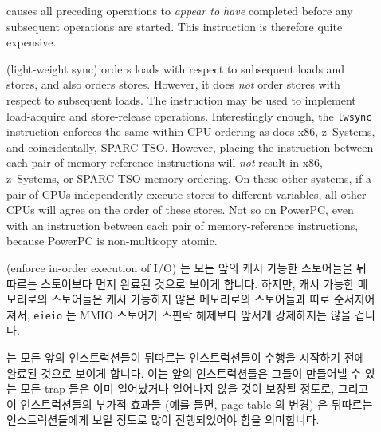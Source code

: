 \begin{description}
\item	[] causes all preceding operations to {\em appear to have}
	completed before any subsequent operations are started.
	This instruction is therefore quite expensive.
\item	[] (light-weight sync) orders loads with respect to
	subsequent loads and stores, and also orders stores.
	However, it does {\em not} order stores with respect to subsequent
	loads.
	The  instruction may be used to implement
	load-acquire and store-release operations.
	Interestingly enough, the {\tt lwsync} instruction enforces
	the same within-CPU ordering as does x86, z~Systems, and coincidentally,
	SPARC TSO.
	However, placing the  instruction between each
	pair of memory-reference instructions will \emph{not}
	result in x86, z~Systems, or SPARC TSO memory ordering.
	On these other systems, if a pair of CPUs independently execute
	stores to different variables, all other CPUs will agree on the
	order of these stores.
	Not so on PowerPC, even with an  instruction between each
	pair of memory-reference instructions, because PowerPC is
	non-multicopy atomic.
\fi
\item	[] (enforce in-order execution of I/O) 는 모든 앞의 캐시
	가능한 스토어들을 뒤따르는 스토어보다 먼저 완료된 것으로 보이게 합니다.
	하지만, 캐시 가능한 메모리로의 스토어들은 캐시 가능하지 않은 메모리로의
	스토어들과 따로 순서지어져서, {\tt eieio} 는 MMIO 스토어가 스핀락
	해제보다 앞서게 강제하지는 않을 겁니다.
\item	[] 는 모든 앞의 인스트럭션들이 뒤따르는 인스트럭션들이
	수행을 시작하기 전에 완료된 것으로 보이게 합니다.
	이는 앞의 인스트럭션들은 그들이 만들어낼 수 있는 모든 trap 들은 이미
	일어났거나 일어나지 않을 것이 보장될 정도로, 그리고 이 인스트럭션들의
	부가적 효과들 (예를 들면, page-table 의 변경) 은 뒤따르는
	인스트럭션들에게 보일 정도로 많이 진행되었어야 함을 의미합니다.

\end{description}


